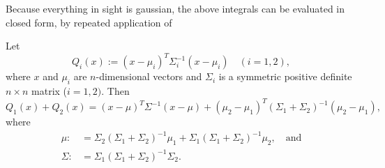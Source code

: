 \documentclass[12pt,leqno]{article}
\begin{document}
Because everything in sight is gaussian, the above integrals can be evaluated in closed form, by repeated application of
\begin{Lem}\label{comp_sq:1}
  Let
  $$
  Q_i(x) := (x-\mu_i)^T\Sigma_i^{-1}(x-\mu_i)\quad(i = 1,2),
  $$
  where $x$ and $\mu_i$ are $n$-dimensional vectors and $\Sigma_i$ is a symmetric positive definite $n\times{n}$
  matrix ($i = 1,2)$. Then
  $$
  Q_1(x) + Q_2(x) = (x-\mu)^T\Sigma^{-1}(x-\mu) + (\mu_2-\mu_1)^T(\Sigma_1+\Sigma_2)^{-1}(\mu_2-\mu_1),
  $$
  where
  \begin{align}
    \mu :&= \Sigma_2(\Sigma_1+\Sigma_2)^{-1}\mu_1+\Sigma_1(\Sigma_1+\Sigma_2)^{-1}\mu_2,\quad\text{and}\label{mu}\\
    \Sigma :&= \Sigma_1(\Sigma_1 + \Sigma_2)^{-1}\Sigma_2\label{sigma}.
  \end{align}
\end{Lem}
\end{document}
